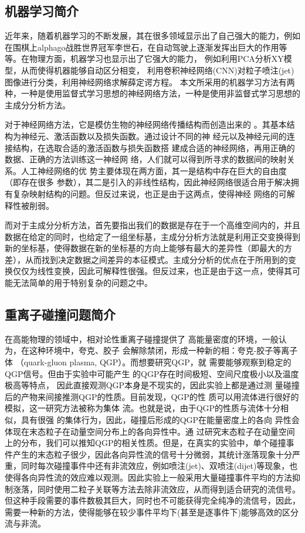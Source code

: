 \documentclass[aps,pre,12pt,preprint,onecolumn,showpacs,showkeys]{revtex4-1}
\begin{document}
\subsection{机器学习简介}
近年来，随着机器学习的不断发展，其在很多领域显示出了自己强大的能力，例如在围棋上alphago战胜世界冠军李世石，在自动驾驶上逐渐发挥出巨大的作用等等。在物理方面，机器学习也显示出了它强大的能力，
例如利用PCA分析XY模型，从而使得机器能够自动区分相变\cite{PhysRevB.96.144432}，
利用卷积神经网络(CNN)对粒子喷注(jet)图像进行分类\cite{PhysRevD.94.112002}，利用神经网络求解薛定谔方程\cite{PhysRevA.96.042113}。
本文所采用的机器学习方法有两种，一种是使用监督式学习思想的神经网络方法，一种是使用非监督式学习思想的主成分分析方法。
\par
对于神经网络方法，它是模仿生物的神经网络传播结构而创造出来的
。其基本结构为神经元、激活函数以及损失函数。通过设计不同的神
经元以及神经元间的连接结构，在选取合适的激活函数与损失函数搭
建成合适的神经网络，再用正确的数据、正确的方法训练这一神经网
络，人们就可以得到所寻求的数据间的映射关系。人工神经网络的优
势主要体现在两方面，其一是结构中存在巨大的自由度（即存在很多
参数），其二是引入的非线性结构，因此神经网络很适合用于解决拥
有复杂映射结构的问题。但反过来说，也正是由于这两点，使得神经
网络的可解释性被削弱。
\par
而对于主成分分析方法，首先要指出我们的数据是存在于一个高维空间内的，并且数据在给定的同时，也给定了一组坐标基，主成分分析方法就是利用正交变换得到新的坐标基，使得数据在新的坐标基的方向上能够有最大的差异性（即最大的方差），从而找到决定数据之间差异的本征模式。主成分分析的优点在于所用到的变换仅仅为线性变换，因此可解释性很强。但反过来，也正是由于这一点，使得其可能无法简单的用于特别复杂的问题之中。
\subsection{重离子碰撞问题简介}
在高能物理的领域中，相对论性重离子碰撞提供了
高能量密度的环境，一般认为，在这种环境中，夸克、胶子
会解除禁闭，形成一种新的相：夸克-胶子等离子体
（quark-gluon plasma, QGP）。而想要研究QGP，就
需要能够观察到稳定的QGP信号。但由于实验中可能产生
的QGP存在时间极短、空间尺度极小以及温度极高等特点，
因此直接观测QGP本身是不现实的，因此实验上都是通过测
量碰撞后的产物来间接推测QGP的性质。目前发现，QGP的性
质可以用流体进行很好的模拟，这一研究方法被称为集体
流。\cite{2017arXiv170300670S}也就是说，由于QGP的性质与流体十分相似，具有很强
的集体行为，因此，碰撞后形成的QGP在能量密度上的各向
异性会体现在末态粒子在动量空间分布上的各向异性中。通
过研究末态粒子在动量空间上的分布，我们可以推知QGP的相关性质。但是，在真实的实验中，单个碰撞事件产生的末态粒子很少，因此各向异性流的信号十分微弱，其统计涨落现象十分严重，同时每次碰撞事件中还有非流效应，例如喷注(jet)、双喷注(dijet)等现象，也使得各向异性流的效应难以观测。因此实验上一般采用大量碰撞事件平均的方法抑制涨落，同时使用二粒子关联等方法去除非流效应，从而得到适合研究的流信号。但这种手段需要的事件数极其巨大，同时也不可能获得完全纯净的流信号，因此，需要一种新的方法，使得能够在较少事件平均下(甚至是逐事件下)能够高效的区分流与非流。
\end{document}
